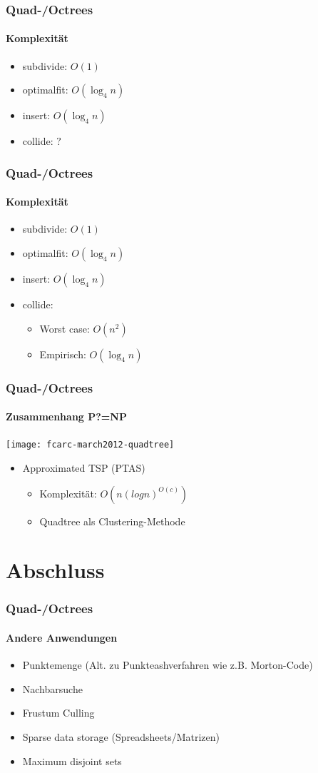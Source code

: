 \documentclass{beamer}
\begin{document}
\begin{frame}
  \frametitle{Quad-/Octrees}
  \framesubtitle{Komplexität}
  \begin{itemize}
    \item subdivide: $O(1)$
    \item optimalfit: $O(\log_4 n)$
    \item insert: $O(\log_4 n)$
    \item collide: $?$
  \end{itemize}
\end{frame}

\begin{frame}
  \frametitle{Quad-/Octrees}
  \framesubtitle{Komplexität}
  \begin{itemize}
    \item subdivide: $O(1)$
    \item optimalfit: $O(\log_4 n)$
    \item insert: $O(\log_4 n)$
    \item collide:
    \begin{itemize}
      \item Worst case: $O(n^2)$
      \item Empirisch: $O(\log_4 n)$
    \end{itemize}
  \end{itemize}
\end{frame}

\begin{frame}
  \frametitle{Quad-/Octrees}
  \framesubtitle{Zusammenhang P?=NP}
  \begin{center}
    \texttt{[image: fcarc-march2012-quadtree]}
  
    \begin{itemize}
      \item Approximated TSP (PTAS) 
      \begin{itemize}
        \item Komplexität: $O(n {(log n)}^{O(c)})$
        \item Quadtree als Clustering-Methode
      \end{itemize}
    \end{itemize}
  \end{center}
\end{frame}

\section{Abschluss}

\begin{frame}
  \frametitle{Quad-/Octrees}
  \framesubtitle{Andere Anwendungen}
  \begin{itemize}
    \item Punktemenge (Alt. zu Punkteashverfahren wie z.B. Morton-Code)
    \item Nachbarsuche
    \item Frustum Culling
    \item Sparse data storage (Spreadsheets/Matrizen)
    \item Maximum disjoint sets
  \end{itemize}
\end{frame}
\end{document}
